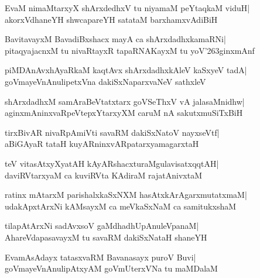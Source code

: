 \documentclass[twoside,12pt,openright]{book}
\newcounter{shloka}[chapter]
\begin{document}
\begin{shloka}%
EvaM nimaMtarxyX shArxdedhxV tu niyamaM peYtaqkaM viduH|\\
akorxVdhaneYH shwcapareYH satataM barxhamxvAdiBiH
\end{shloka}

\begin{shloka}%
BavitavayxM BavadiBxshacx mayA ca shArxdadhxkamaRNi|\\
pitaqyajacnxM tu nivaRtayxR tapaRNAKayxM tu yoV\char'263ginxmAnf
\end{shloka}

\begin{shloka}%
piMDAnAvxhAyaRkaM kaqtAvx shArxdadhxkAleV kaSxyeV tadA|\\
goVmayeVnAnulipetxVna dakiSxNaparxvaNeV sathxleV
\end{shloka}

\begin{shloka}%
shArxdadhxM samAraBeVtatxtarx goVSeThxV vA jalasaMnidhw|\\
aginxmAninxvaRpeVtepxYtarxyXM caruM nA sakutxmuSiTxBiH
\end{shloka}

\begin{shloka}%
tirxBivAR nivaRpAmiVti savaRM dakiSxNatoV nayxseVtf|\\
aBiGAyaR tataH kuyARninxvARpatarxyamagarxtaH
\end{shloka}

\begin{shloka}%
teV vitasAtxyXyatAH kAyARshacxturaMgulavisatxqqtAH|\\
daviRVtarxyaM ca kuviRVta KAdiraM rajatAnivxtaM
\end{shloka}

\begin{shloka}%
ratinx mAtarxM parishalxkaSxNXM hasAtxkArAgarxmutatxmaM|\\
udakApxtArxNi kAMsayxM ca meVkaSxNaM ca samitukxshaM
\end{shloka}

\begin{shloka}%
tilapAtArxNi sadAvxsoV gaMdhadhUpAnuleVpanaM|\\
AhareVdapasavayxM tu savaRM dakiSxNataH shaneYH
\end{shloka}

\begin{shloka}%
EvamAsAdayx tatasxvaRM Bavanasayx puroV Buvi|\\
goVmayeVnAnulipAtxyAM goVmUterxVNa tu maMDalaM 
\end{shloka}
\end{document}
